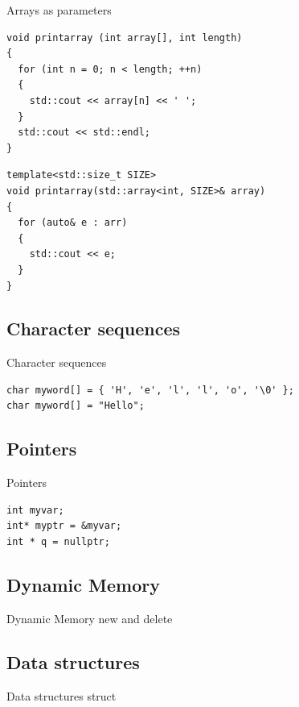 \documentclass{beamer}
\begin{document}
\begin{frame}[fragile]{Arrays as parameters}
\begin{lstlisting}[caption=array as pointer]
void printarray (int array[], int length)
{
  for (int n = 0; n < length; ++n)
  {
    std::cout << array[n] << ' ';
  }
  std::cout << std::endl;
}
\end{lstlisting}

\begin{lstlisting}[caption=array as object]
template<std::size_t SIZE>
void printarray(std::array<int, SIZE>& array)
{
  for (auto& e : arr)
  {
    std::cout << e;
  }
}\end{lstlisting}
\end{frame}

\subsection{Character sequences}
\begin{frame}[fragile]{Character sequences}
\begin{lstlisting}[caption=Character sequences]
char myword[] = { 'H', 'e', 'l', 'l', 'o', '\0' };
char myword[] = "Hello";
\end{lstlisting}
\end{frame}

\subsection{Pointers}
\begin{frame}[fragile]{Pointers}
\begin{lstlisting}
int myvar;
int* myptr = &myvar;
int * q = nullptr;
\end{lstlisting}
\end{frame}

\subsection{Dynamic Memory}
\begin{frame}{Dynamic Memory}
new and delete
\end{frame}

\subsection{Data structures}
\begin{frame}{Data structures}
struct
\end{frame}
\end{document}
